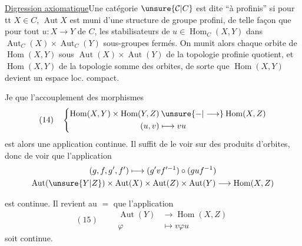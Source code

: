\uline{Digression axiomatique}\quad Une catégorie $\unsure{\mathcal{C}|C}$ est dite   ``à   profinis'' si pour tt $X\in C$, $\operatorname{Aut}X$ est muni d'une structure de groupe profini, de telle façon que pour tout $u:X\longrightarrow Y$ de $C$, les stabilisateurs de $u\in\operatorname{Hom}_C(X,Y)$ dans $\operatorname{Aut}_C(X)\times\operatorname{Aut}_C(Y)$    sous-groupes fermés.  On munit alors chaque orbite de $\operatorname{Hom}(X,Y)$ sous $\operatorname{Aut}(X)\times\operatorname{Aut}(Y)$ de la topologie profinie quotient, et $\operatorname{Hom}(X,Y)$ de la topologie  somme des orbites, de sorte que $\operatorname{Hom}(X,Y)$ devient un espace loc. compact.

Je   que l'accouplement des morphismes
\[
(14)\quad\left\{
\begin{aligned}
\operatorname{Hom}(X,Y)\times\operatorname{Hom}(Y,Z)&\mathbin{\unsure{-|\longrightarrow}}\operatorname{Hom}(X,Z)\\
(u,v)&\longmapsto vu
\end{aligned}\right.
\]
est alors  une  application continue. Il suffit de le voir sur des produits d'orbites, donc de voir que  l'application
\[
\begin{gathered}
(g,f,g',f')\longmapsto(g'vf'^{-1})\circ(guf^{-1})\\
\operatorname{Aut}(\unsure{Y|Z})\times\operatorname{Aut}(X)\times\operatorname{Aut}(Z)\times\operatorname{Aut}(Y)\longrightarrow\operatorname{Hom}(X,Z)
\end{gathered}
\]

est continue. Il revient au $=$ que l'application
\[
(15)\qquad\begin{aligned}
\operatorname{Aut}(Y)&\longrightarrow\operatorname{Hom}(X,Z)\\
\varphi&\longmapsto v\varphi u
\end{aligned}
\]
soit continue.

